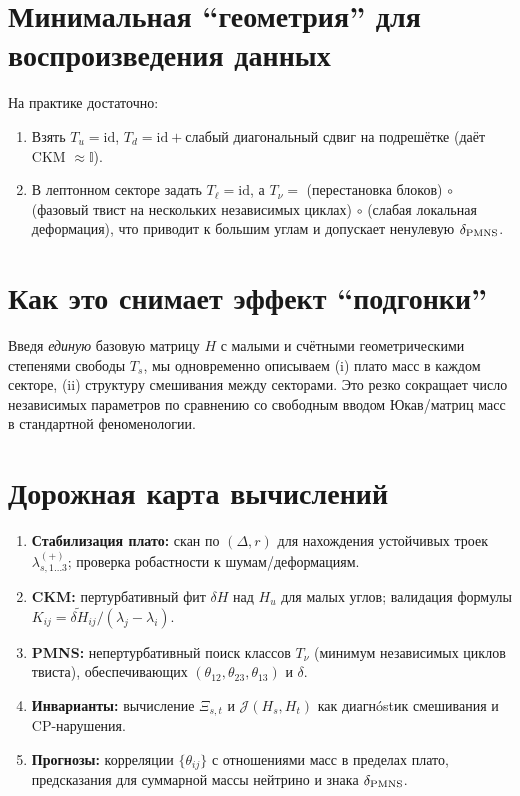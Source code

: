 \documentclass[12pt,a4paper]{article}
\begin{document}
\section{Минимальная ``геометрия'' для воспроизведения данных}
На практике достаточно:
\begin{enumerate}
\item Взять $T_u=\mathrm{id}$, $T_d=\mathrm{id}+\text{слабый диагональный сдвиг}$ на подрешётке (даёт CKM $\approx \mathbb{I}$).
\item В лептонном секторе задать $T_\ell=\mathrm{id}$, а $T_\nu =$ (перестановка блоков) $\circ$ (фазовый твист на нескольких независимых циклах) $\circ$ (слабая локальная деформация), что приводит к большим углам и допускает ненулевую $\delta_{\rm PMNS}$.
\end{enumerate}

\section{Как это снимает эффект ``подгонки''}
Введя \emph{единую} базовую матрицу $H$ с малыми и счётными геометрическими степенями свободы $T_s$, мы одновременно описываем (i) плато масс в каждом секторе, (ii) структуру смешивания между секторами. Это резко сокращает число независимых параметров по сравнению со свободным вводом Юкав/матриц масс в стандартной феноменологии.

\section{Дорожная карта вычислений}
\begin{enumerate}
\item \textbf{Стабилизация плато:} скан по $(\Delta,r)$ для нахождения устойчивых троек $\lambda_{s,1\ldots 3}^{(+)}$; проверка робастности к шумам/деформациям.
\item \textbf{CKM:} пертурбативный фит $\delta H$ над $H_u$ для малых углов; валидация формулы $K_{ij}=\widetilde{\delta H}_{ij}/(\lambda_j-\lambda_i)$.
\item \textbf{PMNS:} непертурбативный поиск классов $T_\nu$ (минимум независимых циклов твиста), обеспечивающих $(\theta_{12},\theta_{23},\theta_{13})$ и $\delta$.
\item \textbf{Инварианты:} вычисление $\Xi_{s,t}$ и $\mathcal{J}(H_s,H_t)$ как диагнóstик смешивания и CP-нарушения.
\item \textbf{Прогнозы:} корреляции $\{\theta_{ij}\}$ с отношениями масс в пределах плато, предсказания для суммарной массы нейтрино и знака $\delta_{\rm PMNS}$.
\end{enumerate}
\end{document}
